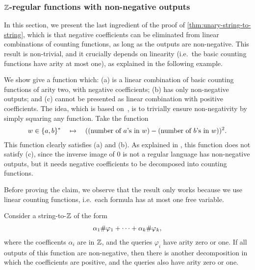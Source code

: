 \subsubsection{${\mathbb Z}$-regular functions with non-negative outputs}

In this section, we present the last ingredient of the proof of \cref{thm:unary-string-to-string}, which is that negative coefficients can be eliminated from linear combinations of counting functions, as long as the outputs are non-negative. This result is non-trivial, and it crucially depends on linearity (i.e.~the basic counting functions have arity at most one), as explained in the following example.

\begin{myexample}\label{ex:quadratic-counterexample}
     We show give a function which: (a) is a linear combination of basic counting functions of arity two, with negative coefficients; (b) has only non-negative outputs; and (c) cannot be presented as linear combination with positive coefficients. The idea, which is based on~\cite[Example 2.1]{BerstelReutenauer08}, is to trivially ensure non-negativity by simply squaring any function. Take the function
\begin{align*}
w \in \{a,b\}^* 
\quad \mapsto \quad 
(\text{(number of $a$'s in $w$)} - \text{(number of $b$'s in $w$)})^2.
\end{align*}
This function clearly satisfies (a) and (b). As explained in \cite[p.3]{Zpolyreg23}, this function does not satisfy (c), since the inverse image of $0$ is not a regular language
has non-negative outputs, but it needs negative coefficients to be decomposed into \mso counting functions.
\end{myexample}

    Before proving the claim, we observe that the result only works because we use linear \mso counting functions, i.e.~each \mso formula has at most one free variable.



\label{sec:non-negative}
\begin{theorem}\label{thm:int-to-nat}
    Consider a string-to-${\mathbb Z}$ of the form
    \begin{align*}
 \alpha_1 \#{\varphi_1} + \cdots +  \alpha_k \#{\varphi_k},
    \end{align*}        
        where the coefficents $\alpha_i$ are in ${\mathbb Z}$, and the queries $\varphi_i$ have arity zero or one. If all outputs of this function are non-negative, then there is another decomposition in which the coefficients are positive, and the queries also have arity zero or one.
\end{theorem}

